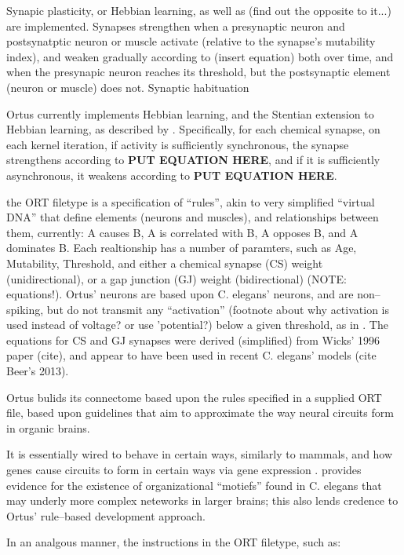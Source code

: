 \documentclass[letterpaper]{article}
\begin{document}
Synapic plasticity, or Hebbian learning, as well as (find out the opposite to it...) are implemented. Synapses strengthen when a presynaptic neuron and postsynatptic neuron or muscle activate (relative to the synapse's mutability index), and weaken gradually according to (insert equation) both over time, and when the presynapic neuron reaches its threshold, but the postsynaptic element (neuron or muscle) does not.
Synaptic habituation

Ortus currently implements Hebbian learning, and the Stentian extension to Hebbian learning, as described by \cite{Kutsarova2016}. Specifically, for each chemical synapse, on each kernel iteration, if activity is sufficiently synchronous, the synapse strengthens according to \textbf{PUT EQUATION HERE}, and if it is sufficiently asynchronous, it weakens according to \textbf{PUT EQUATION HERE}. 


the ORT filetype is a specification of ``rules'', akin to very simplified ``virtual DNA'' that define elements (neurons and muscles), and relationships between them, currently: A causes B, A is correlated with B, A opposes B, and A dominates B. Each realtionship has a number of paramters, such as Age, Mutability, Threshold, and either a chemical synapse (CS) weight (unidirectional), or a gap junction (GJ) weight (bidirectional) (NOTE: equations!). Ortus' neurons are based upon C. elegans' neurons, and are non--spiking, but do not transmit any ``activation'' (footnote about why activation is used instead of voltage? or use 'potential?) below a given threshold, as in \citep{Graubard1014}. The equations for CS and GJ synapses were derived (simplified) from Wicks' 1996 paper (cite), and appear to have been used in recent C. elegans' models (cite Beer's 2013).


Ortus bulids its connectome based upon the rules specified in a supplied ORT file, based upon guidelines that aim to approximate the way neural circuits form in organic brains.

It is essentially wired to behave in certain ways, similarly to mammals, and how genes cause circuits to form in certain ways via gene expression \citep{MNCF:wiredforbehaviors}. 
\citet{Schroter2017} provides evidence for the existence of organizational ``motiefs'' found in C. elegans that may underly more complex neteworks in larger brains; this also lends credence to Ortus' rule--based development approach.

In an analgous manner, the instructions in the ORT filetype, such as:
\end{document}
